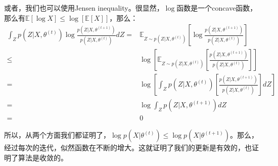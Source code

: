 \documentclass[a4paper]{article}
\begin{document}
或者，我们也可以使用Jensen inequality。很显然，$\log$函数是一个concave函数，那么有$\mathbb{E}[\log X] \leq \log [\mathbb{E}[X]]$，那么：
\begin{equation}
    \begin{split}
        \int_Z p(Z|X,\theta^{(t)}) \log \frac{p(Z|X,\theta^{(t+1)})}{p(Z|X,\theta^{(t)})}dZ 
        = & \mathbb{E}_{Z\sim p(Z|X,\theta^{(t)})}\left[ \log \frac{p(Z|X,\theta^{(t+1)})}{p(Z|X,\theta^{(t)})} \right] \\
        \leq & \log \left[ \mathbb{E}_{Z\sim p(Z|X,\theta^{(t)})} \left[ \frac{p(Z|X,\theta^{(t+1)})}{p(Z|X,\theta^{(t)})} \right] \right] \\
         = & \log \left[ \int_Z p(Z|X,\theta^{(t)}) \left[ \frac{p(Z|X,\theta^{(t+1)})}{p(Z|X,\theta^{(t)})} \right]dZ \right] \\
         = & \log \int_Z p(Z|X,\theta^{(t+1)}) dZ\\
         = & 0
    \end{split}
\end{equation}

所以，从两个方面我们都证明了，$\log p(X|\theta^{(t)}) \leq \log p(X|\theta^{(t+1)})$。那么，经过每次的迭代，似然函数在不断的增大。这就证明了我们的更新是有效的，也证明了算法是收敛的。
\end{document}
